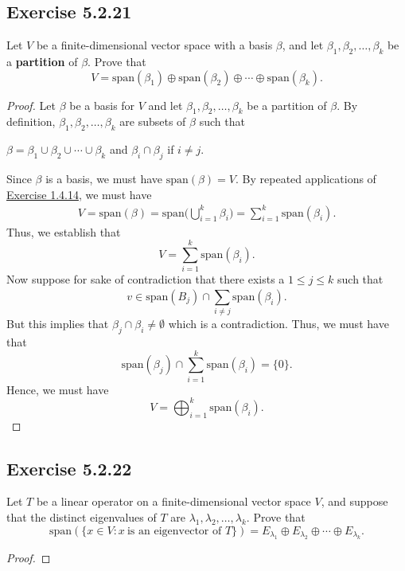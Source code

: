 \subsection*{Exercise 5.2.21} Let \( V  \) be a finite-dimensional vector space with a basis \( \beta  \), and let \( {\beta}_{1}, {\beta}_{2}, \dots, {\beta}_{k} \) be a \textbf{partition} of \( \beta  \). Prove that  
\[  V = \text{span}({\beta}_{1}) \oplus \text{span}({\beta}_{2}) \oplus \cdots \oplus \text{span}({\beta}_{k}).  \]
\begin{proof}
Let \( \beta \) be a basis for \( V  \) and let \( {\beta}_{1}, {\beta}_{2}, \dots, {\beta}_{k} \) be a partition of \( \beta \). By definition, \( {\beta}_{1}, {\beta}_{2}, \dots, {\beta}_{k } \) are subsets of \( \beta \) such that
\begin{center}
    \( \beta = {\beta}_{1} \cup {\beta}_{2} \cup \cdots \cup {\beta}_{k} \) and \( {\beta}_{i} \cap {\beta}_{j} \) if \( i \neq j \).
\end{center}
Since \( \beta \) is a basis, we must have \( \text{span}(\beta) = V  \). By repeated applications of {\hyperref[Exercise 1.4.14]{Exercise 1.4.14}}, we must have
\begin{align*}
    V = \text{span}(\beta) = \text{span}\Big(\bigcup_{ i=1 }^{ k  }  {\beta}_{i}\Big) = \sum_{ i=1  }^{ k  } \text{span}({\beta}_{i}).
\end{align*}
Thus, we establish that
\[  V = \sum_{ i=1  }^{ k  } \text{span}({\beta}_{i}). \]
Now suppose for sake of contradiction that there exists a \( 1 \leq j \leq k  \) such that
\[  v \in \text{span}({B}_{j}) \cap \sum_{  i \neq j  }^{  } \text{span}({\beta}_{i}). \]
But this implies that \( {\beta}_{j} \cap {\beta}_{i} \neq \emptyset \) which is a contradiction. Thus, we must have that
\[  \text{span}({\beta}_{j}) \cap \sum_{ i=1  }^{ k  } \text{span}({\beta}_{i})  = \{  0  \}.\]
Hence, we must have 
\[  V = \bigoplus_{i=1}^{k} \text{span}({\beta}_{i}). \]
\end{proof}

\subsection*{Exercise 5.2.22} Let \( T  \) be a linear operator on a finite-dimensional vector space \( V  \), and suppose that the distinct eigenvalues of \( T  \) are \( {\lambda}_{1}, {\lambda}_{2}, \dots, {\lambda}_{k} \). Prove that
\[  \text{span}(\{ x \in V : x \ \text{is an eigenvector of } T  \} ) = {E}_{{\lambda}_{1}} \oplus {E}_{{\lambda}_{2}} \oplus \cdots \oplus {E}_{\lambda_{k }}. \]
\begin{proof}

\end{proof}
